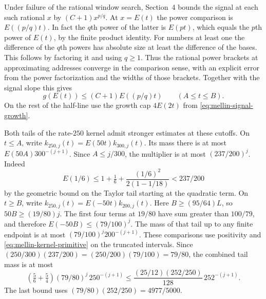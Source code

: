 \documentclass[11pt]{amsart}
\theoremstyle{definition}
\theoremstyle{remark}
\numberwithin{equation}{section}
\begin{document}
Under failure of the rational window search, Section~4 bounds
the signal at each such rational \(x\) by \((C+1)x^{p/q}\).
At \(x=E(t)\) the power comparison is \(E((p/q)t)\).
In fact the \(q\)th power of the latter is \(E(pt)\), which
equals the \(p\)th power of \(E(t)\), by the finite product
identity. For numbers at least one the difference of the
\(q\)th powers has absolute size at least the difference of
the bases. This follows by factoring it and using \(q\ge1\).
Thus the rational power brackets at approximating addresses
converge in the comparison sense, with an explicit error
from the power factorization and the widths of those brackets.
Together with the signal slope this gives
\[
                g(E(t))\le(C+1)E((p/q)t)\qquad(A\le t\le B).
\]
On the rest of the half-line use the growth cap
\(4E(2t)\) from \eqref{eq:mellin-signal-growth}.

Both tails of the rate-\(250\) kernel admit stronger
estimates at these cutoffs. On \(t\le A\), write
\(k_{250,j}(t)=E(50t)k_{300,j}(t)\). Its mass there is
at most \(E(50A)300^{-(j+1)}\).
Since \(A\le j/300\), the multiplier is at most
\((237/200)^j\). Indeed
\[
 E(1/6)\le1+\tfrac16+
               \frac{(1/6)^2}{2(1-1/18)}<237/200
\]
by the geometric bound on the Taylor tail starting at the
quadratic term. On \(t\ge B\), write
\(k_{250,j}(t)=E(-50t)k_{200,j}(t)\).
Here \(B\ge(95/64)L\), so \(50B\ge(19/80)j\).
The first four terms at \(19/80\) have sum greater than
\(100/79\), and therefore \(E(-50B)\le(79/100)^j\).
The mass of that tail up to any finite endpoint is at most
\((79/100)^j200^{-(j+1)}\).
These comparisons use positivity and
\eqref{eq:mellin-kernel-primitive} on the truncated intervals.
Since
\((250/300)(237/200)=(250/200)(79/100)=79/80\),
the combined tail mass is at most
\[
    \left(\tfrac56+\tfrac54\right)(79/80)^j\,250^{-(j+1)}
       \le \frac{(25/12)(252/250)}{128}\,252^{-(j+1)}.
\]
The last bound uses \((79/80)(252/250)=4977/5000\).
\end{document}
